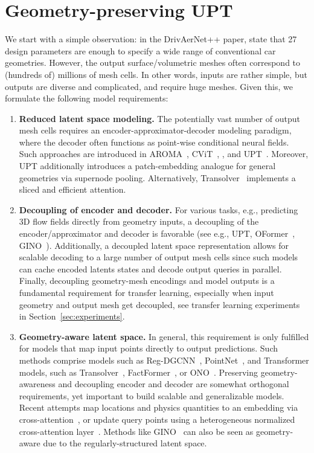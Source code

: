 \section{Geometry-preserving UPT}
\label{sec:methodology}
We start with a simple observation: in the DrivAerNet++ paper, \citet{elrefaie2024drivaernet++} state that 27 design parameters are enough to specify a wide range of conventional car geometries.
However, the output surface/volumetric meshes often correspond to (hundreds of) millions of mesh cells. 
In other words, inputs are rather simple, but outputs are diverse and complicated, and require huge meshes. 
Given this, we formulate the following model requirements:
\begin{enumerate}[label={(\Roman*)}, noitemsep,topsep=0pt]
    \itemsep0em 
    \item \label{req1} \textbf{Reduced latent space modeling.} The potentially vast number of output mesh cells requires an encoder-approximator-decoder modeling paradigm, where the decoder often functions as point-wise conditional neural fields. 
    Such approaches are introduced in AROMA~\citep{serrano2024aroma}, CViT~\citep{wang2024cvit}, \citet{knigge2024space}, and \ac{UPT}~\citep{alkin2024universal}. Moreover, \ac{UPT} additionally introduces a patch-embedding analogue for general geometries via supernode pooling. Alternatively, Transolver~\citep{wu2024transolver} implements a sliced and efficient attention.
    \item \label{req2} \textbf{Decoupling of encoder and decoder.} For various tasks, e.g., predicting 3D flow fields directly from geometry inputs, a decoupling of the encoder/approximator and decoder is favorable (see e.g., \ac{UPT}, OFormer~\citep{Li:OFormer}, \ac{GINO}~\citep{Li:23}). Additionally, a decoupled latent space representation allows for scalable decoding to a large number of output mesh cells since such models can cache encoded latents states and decode output queries in parallel. Finally, decoupling geometry-mesh encodings and model outputs is a fundamental requirement for transfer learning, especially when input geometry and output mesh get decoupled, see transfer learning experiments in Section~\ref{sec:experiments}.
    \item \label{req3} \textbf{Geometry-aware latent space.} In general, this requirement is only fulfilled for models that map input points directly to output predictions. Such methods comprise models such as Reg-DGCNN~\citep{wang2019dynamic, elrefaie2024drivaernet, elrefaie2024drivaernet++}, PointNet~\citep{qi2017pointnet}, and Transformer models, such as Transolver~\citep{wu2024transolver}, FactFormer~\citep{li2024scalable}, or ONO~\citep{xiao2023improved}. Preserving geometry-awareness and decoupling encoder and decoder are somewhat orthogonal requirements, yet important to build scalable and generalizable models. Recent attempts map locations and physics quantities to an embedding via cross-attention~\citep{wang2024latent}, or update query points using a heterogeneous normalized cross-attention layer~\citep{hao2023gnot}.
    Methods like \ac{GINO}~\citep{Li:23} can also be seen as geometry-aware due to the regularly-structured latent space.
\end{enumerate}

